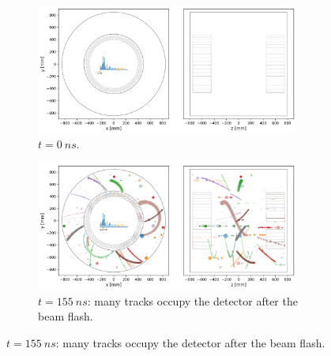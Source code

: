 \begin{figure}
    \centering
    
    \captionsetup[subfigure]{justification=centering}
    \begin{subfigure}[t]{0.49\textwidth}
    \centering
    \includegraphics[width=0.95\textwidth]{chapter3/frame_005.png}
    \caption{$t=\SI{0}{ns}$.}
    \end{subfigure}
    \hfill
    \begin{subfigure}[t]{0.49\textwidth}
    \centering
    \includegraphics[width=0.95\textwidth]{chapter3/frame_036.png}  
    \caption{$t=\SI{155}{ns}$: many tracks occupy the detector after the beam flash.}
    \end{subfigure}
    
    \vspace{0.3cm}
    

\end{figure}

